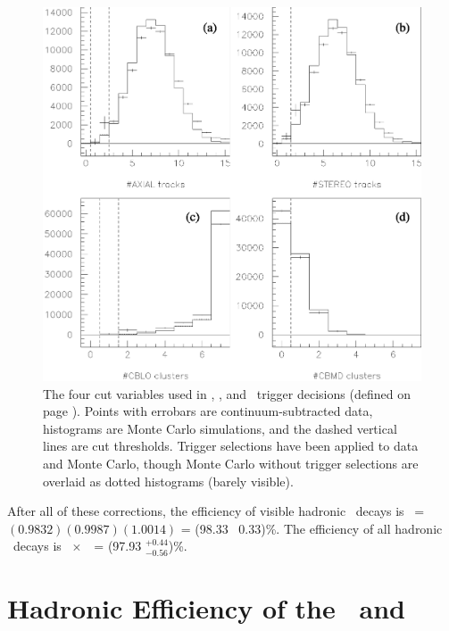 \documentclass{cornell}
\begin{document}
\begin{figure}[p]
  \begin{center}
    \includegraphics[width=\linewidth]{triggeragreement}
  \end{center}
  \caption[Test of the Monte Carlo trigger simulation in $e^+e^- \to
  \Upsilon(1S)$]{\label{triggeragreement} The four cut variables used
  in \hadron, \radtau, and \eltrack\ trigger decisions (defined on
  page \pageref{pag:triggerdefs}).  Points with errobars are
  continuum-subtracted data, histograms are Monte Carlo simulations,
  and the dashed vertical lines are cut thresholds.  Trigger
  selections have been applied to data and Monte Carlo, though Monte
  Carlo without trigger selections are overlaid as dotted histograms
  (barely visible).}
\end{figure}

After all of these corrections, the efficiency of visible hadronic
\us\ decays is \ecuts\ = $(0.9832)(0.9987)(1.0014)$ = (98.33 \PM\
0.33)\%.  The efficiency of all hadronic \us\ decays is
\evis~$\times$~\ecuts\ = (97.93 $^{+0.44}_{-0.56}$)\%.

\section{Hadronic Efficiency of the \boldmath \uss\ and \usss}
\label{sec:ussusssefficiency}
\end{document}
